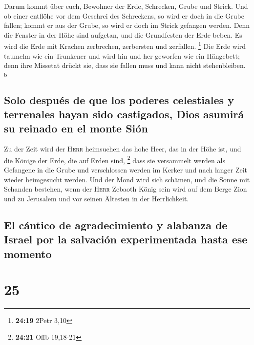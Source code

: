  Darum kommt über euch, Bewohner der Erde, Schrecken,
Grube und Strick.  Und ob einer entflöhe vor dem Geschrei
des Schreckens, so wird er doch in die Grube fallen; kommt er aus der
Grube, so wird er doch im Strick gefangen werden. Denn die Fenster in
der Höhe sind aufgetan, und die Grundfesten der Erde beben.
 Es wird die Erde mit Krachen zerbrechen, zerbersten und
zerfallen. \footnote{\textbf{24:19} 2Petr 3,10}  Die Erde
wird taumelm wie ein Trunkener und wird hin und her geworfen wie ein
Hängebett; denn ihre Missetat drückt sie, dass sie fallen muss und kann
nicht stehenbleiben. \textsuperscript{b}

\hypertarget{solo-despuuxe9s-de-que-los-poderes-celestiales-y-terrenales-hayan-sido-castigados-dios-asumiruxe1-su-reinado-en-el-monte-siuxf3n}{%
\subsection{Solo después de que los poderes celestiales y terrenales
hayan sido castigados, Dios asumirá su reinado en el monte
Sión}\label{solo-despuuxe9s-de-que-los-poderes-celestiales-y-terrenales-hayan-sido-castigados-dios-asumiruxe1-su-reinado-en-el-monte-siuxf3n}}

 Zu der Zeit wird der \textsc{Herr} heimsuchen das hohe
Heer, das in der Höhe ist, und die Könige der Erde, die auf Erden sind,
\footnote{\textbf{24:21} Offb 19,18-21}  dass sie
versammelt werden als Gefangene in die Grube und verschlossen werden im
Kerker und nach langer Zeit wieder heimgesucht werden. 
Und der Mond wird sich schämen, und die Sonne mit Schanden bestehen,
wenn der \textsc{Herr} Zebaoth König sein wird auf dem Berge Zion und zu
Jerusalem und vor seinen Ältesten in der Herrlichkeit.

\hypertarget{el-cuxe1ntico-de-agradecimiento-y-alabanza-de-israel-por-la-salvaciuxf3n-experimentada-hasta-ese-momento}{%
\subsection{El cántico de agradecimiento y alabanza de Israel por la
salvación experimentada hasta ese
momento}\label{el-cuxe1ntico-de-agradecimiento-y-alabanza-de-israel-por-la-salvaciuxf3n-experimentada-hasta-ese-momento}}

\hypertarget{section-24}{%
\section{25}\label{section-24}}

